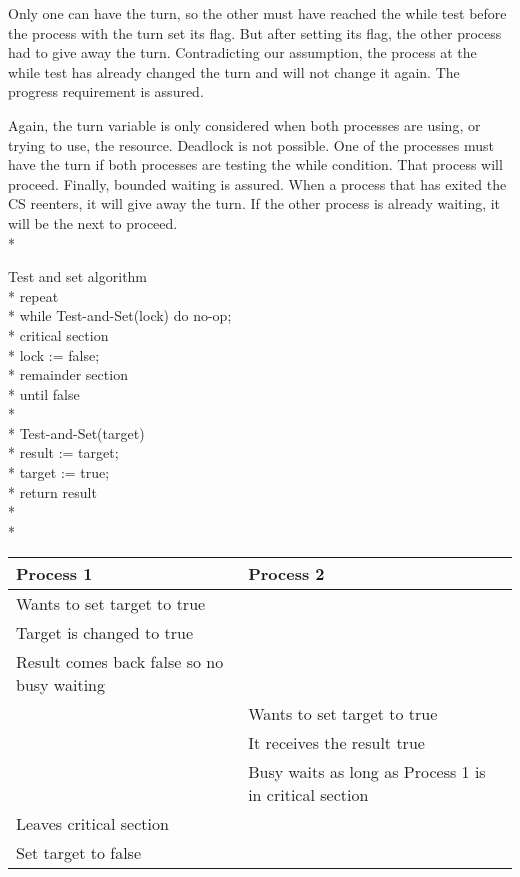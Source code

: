 Only one can have the turn, so the other must have reached the while test before the process with the turn set its flag. 
But after setting its flag, the other process had to give away the turn. 
Contradicting our assumption, the process at the while test has already changed the turn and will not change it again.
	The progress requirement is assured. 
	
	Again, the turn variable is only considered when both processes are using, or trying to use, the resource.
	Deadlock is not possible. One of the processes must have the turn if both processes are testing the while condition. 
	That process will proceed.
	Finally, bounded waiting is assured. When a process that has exited the CS reenters, it will give away the turn. 
	If the other process is already waiting, it will be the next to proceed.\\*

Test and set algorithm\\*
repeat\\*
while Test-and-Set(lock) do no-op;\\*
critical section \\*
lock := false;\\*
remainder section \\*
until false \\*\\*
Test-and-Set(target) \\*
result := target;\\*
target := true; \\*
return result \\*\\*
\begin{tabular}{ |p{4.0cm}| p{4.0cm} | }
  \hline                       
  Process 1	& Process 2 \\ \hline 
  Wants to set target to true & \\
  Target is changed to true & \\
  Result comes back false so no busy waiting &\\
  & Wants to set target to true \\
  & It receives the result true \\
  & Busy waits as long as Process 1 is in critical section \\
  Leaves critical section & \\
  Set target to false & \\
  \hline  
\end{tabular}
